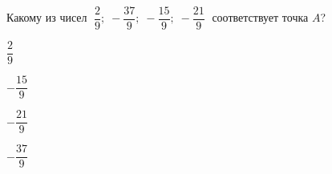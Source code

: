 \begin{ex}
	\begin{condition}
		Какому из чисел \( \;\dfrac{2}{9};\;-\dfrac{37}{9};\;-\dfrac{15}{9};\;-\dfrac{21}{9}\; \) соответствует точка $A$?
		
		\selectanswer
		\begin{enumcols}[columns=4]
			\item $\dfrac{2}{9}$
			\item $-\dfrac{15}{9}$
			\item $-\dfrac{21}{9}$
			\item $-\dfrac{37}{9}$
		\end{enumcols}
	\end{condition}
\end{ex}